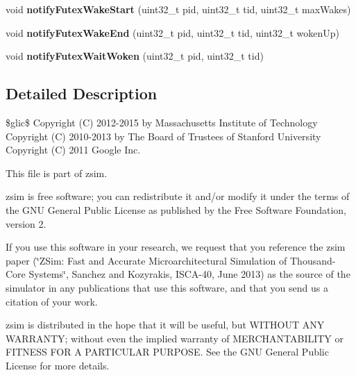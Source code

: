\begin{DoxyCompactItemize}
\item 
\hypertarget{classScheduler_a468d55223c4d9f35dcef4560af08db02}{void {\bfseries notify\-Futex\-Wake\-Start} (uint32\-\_\-t pid, uint32\-\_\-t tid, uint32\-\_\-t max\-Wakes)}\label{classScheduler_a468d55223c4d9f35dcef4560af08db02}

\item 
\hypertarget{classScheduler_ae753f04c09271e92605bec305a9dc572}{void {\bfseries notify\-Futex\-Wake\-End} (uint32\-\_\-t pid, uint32\-\_\-t tid, uint32\-\_\-t woken\-Up)}\label{classScheduler_ae753f04c09271e92605bec305a9dc572}

\item 
\hypertarget{classScheduler_a3c95a5d0c8b40e411bbe95f249dfaafc}{void {\bfseries notify\-Futex\-Wait\-Woken} (uint32\-\_\-t pid, uint32\-\_\-t tid)}\label{classScheduler_a3c95a5d0c8b40e411bbe95f249dfaafc}

\end{DoxyCompactItemize}


\subsection{Detailed Description}
\$glic\$ Copyright (C) 2012-\/2015 by Massachusetts Institute of Technology Copyright (C) 2010-\/2013 by The Board of Trustees of Stanford University Copyright (C) 2011 Google Inc.

This file is part of zsim.

zsim is free software; you can redistribute it and/or modify it under the terms of the G\-N\-U General Public License as published by the Free Software Foundation, version 2.

If you use this software in your research, we request that you reference the zsim paper (\char`\"{}\-Z\-Sim\-: Fast and Accurate Microarchitectural Simulation of
\-Thousand-\/\-Core Systems\char`\"{}, Sanchez and Kozyrakis, I\-S\-C\-A-\/40, June 2013) as the source of the simulator in any publications that use this software, and that you send us a citation of your work.

zsim is distributed in the hope that it will be useful, but W\-I\-T\-H\-O\-U\-T A\-N\-Y W\-A\-R\-R\-A\-N\-T\-Y; without even the implied warranty of M\-E\-R\-C\-H\-A\-N\-T\-A\-B\-I\-L\-I\-T\-Y or F\-I\-T\-N\-E\-S\-S F\-O\-R A P\-A\-R\-T\-I\-C\-U\-L\-A\-R P\-U\-R\-P\-O\-S\-E. See the G\-N\-U General Public License for more details.

